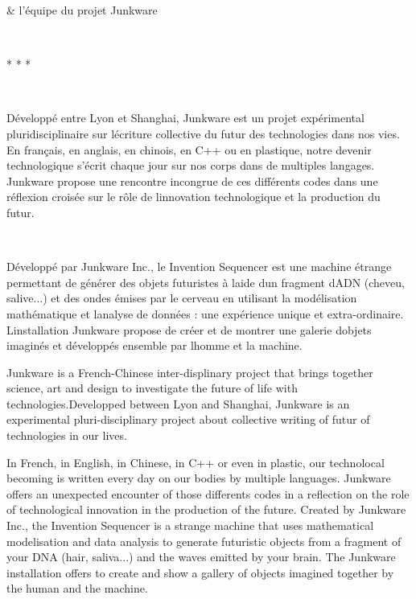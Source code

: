 \& l{\textquoteright}\'equipe du projet Junkware

~

{\centering
* * *
\par}

~

D\'evelopp\'e entre Lyon et Shanghai, Junkware est un projet
exp\'erimental pluridisciplinaire sur l{\textquotesingle}\'ecriture
collective du futur des technologies dans nos vies. En fran\c{c}ais, en
anglais, en chinois, en C++ ou en plastique, notre devenir
technologique s{\textquoteright}\'ecrit chaque jour sur nos corps dans
de multiples langages. Junkware propose une rencontre incongrue de ces
diff\'erents {\textquotedbl}codes{\textquotedbl} dans une r\'eflexion
crois\'ee sur le r\^ole de l{\textquotesingle}innovation technologique
et la production du futur.

~

D\'evelopp\'e par Junkware Inc., le Invention Sequencer est une machine
\'etrange permettant de g\'en\'erer des objets futuristes \`a
l{\textquotesingle}aide d{\textquotesingle}un fragment
d{\textquotesingle}ADN (cheveu, salive...) et des ondes \'emises par le
cerveau en utilisant la mod\'elisation math\'ematique et
l{\textquotesingle}analyse de donn\'ees : une exp\'erience unique et
extra-ordinaire. L{\textquotesingle}installation Junkware propose de
cr\'eer et de montrer une galerie d{\textquotesingle}objets imagin\'es
et d\'evelopp\'es ensemble par l{\textquotesingle}homme et la machine.

Junkware is a French-Chinese inter-displinary project that brings
together science, art and design to investigate the future of life with
technologies.Developped between Lyon and Shanghai, Junkware is an
experimental pluri-disciplinary project about collective writing of
futur of technologies in our lives.

In French, in English, in Chinese, in C++ or even in plastic, our
technolocal becoming is written every day on our bodies by multiple
languages. Junkware offers an unexpected encounter of those differents
{\textquotedbl}codes{\textquotedbl} in a reflection on the role of
technological innovation in the production of the future.\newline
Created by Junkware Inc., the Invention Sequencer is a strange machine
that uses mathematical modelisation and data analysis to generate
futuristic objects from a fragment of your DNA (hair, saliva...) and
the waves emitted by your brain. The Junkware installation offers to
create and show a gallery of objects imagined together by the human and
the machine.\newline
\newline
\newline



